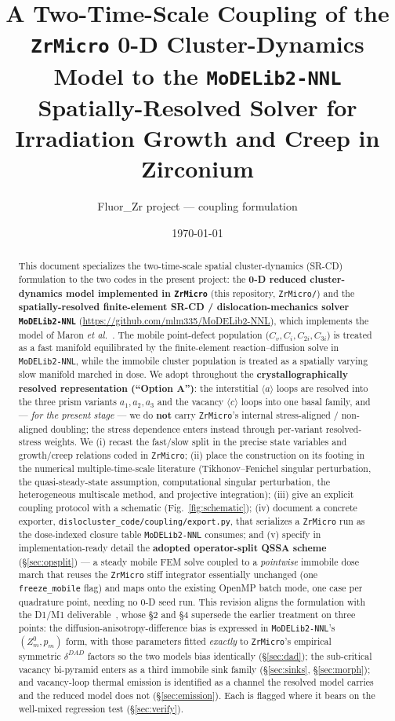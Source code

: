 \documentclass[11pt]{article}
\title{A Two-Time-Scale Coupling of the \texttt{ZrMicro} 0-D Cluster-Dynamics
Model to the \texttt{MoDELib2-NNL} Spatially-Resolved Solver for Irradiation
Growth and Creep in Zirconium}
\author{Fluor\_Zr project --- coupling formulation}
\date{\today}
\newcommand{\ZrMicro}{\texttt{ZrMicro}}
\newcommand{\MoDELib}{\texttt{MoDELib2-NNL}}
\newcommand{\code}[1]{\texttt{#1}}
\begin{document}
\maketitle

\begin{abstract}
This document specializes the two-time-scale spatial cluster-dynamics (SR-CD)
formulation to the two codes in the present project: the \textbf{0-D reduced
cluster-dynamics model implemented in \ZrMicro{}} (this repository,
\code{ZrMicro/}) and the \textbf{spatially-resolved finite-element SR-CD /
dislocation-mechanics solver \MoDELib{}}
(\url{https://github.com/mlm335/MoDELib2-NNL}), which implements the model of
Maron \emph{et al.}~\cite{Maron2024}. The mobile point-defect population
($C_v,C_i,C_{2i},C_{3i}$) is treated as a fast manifold equilibrated by the
finite-element reaction--diffusion solve in \MoDELib{}, while the immobile
cluster population is treated as a spatially varying slow manifold marched in
dose. We adopt throughout the \textbf{crystallographically resolved
representation (``Option A'')}: the interstitial $\langle a\rangle$ loops are
resolved into the three prism variants $a_1,a_2,a_3$ and the vacancy
$\langle c\rangle$ loops into one basal family, and --- \emph{for the present
stage} --- we do \textbf{not} carry \ZrMicro{}'s internal stress-aligned /
non-aligned doubling; the stress dependence enters instead through per-variant
resolved-stress weights. We (i) recast the fast/slow split in the precise state
variables and growth/creep relations coded in \ZrMicro{}; (ii) place the
construction on its footing in the numerical multiple-time-scale literature
(Tikhonov--Fenichel singular perturbation, the quasi-steady-state assumption,
computational singular perturbation, the heterogeneous multiscale method, and
projective integration); (iii) give an explicit coupling protocol with a
schematic (Fig.~\ref{fig:schematic}); (iv) document a concrete exporter,
\code{dislocluster\_code/coupling/export.py}, that serializes a \ZrMicro{} run as
the dose-indexed closure table \MoDELib{} consumes; and (v) specify in
implementation-ready detail the \textbf{adopted operator-split QSSA scheme}
(\S\ref{sec:opsplit}) --- a steady mobile FEM solve coupled to a \emph{pointwise}
immobile dose march that reuses the \ZrMicro{} stiff integrator essentially
unchanged (one \code{freeze\_mobile} flag) and maps onto the existing OpenMP
batch mode, one case per quadrature point, needing no 0-D seed run.
This revision aligns the formulation with the D1/M1
deliverable~\cite{PoGhoniem2026D1M1}, whose \S2 and \S4 supersede the earlier
treatment on three points: the diffusion-anisotropy-difference bias is expressed
in \MoDELib{}'s $(Z^0_m,p_m)$ form, with those parameters fitted \emph{exactly}
to \ZrMicro{}'s empirical symmetric $\delta^{DAD}$ factors so the two models bias
identically (\S\ref{sec:dad}); the sub-critical vacancy
bi-pyramid enters as a third immobile sink family (\S\ref{sec:sinks},
\S\ref{sec:morph}); and vacancy-loop thermal emission is identified as a channel
the resolved model carries and the reduced model does not
(\S\ref{sec:emission}). Each is flagged where it bears on the well-mixed
regression test (\S\ref{sec:verify}).
\end{abstract}
\end{document}
